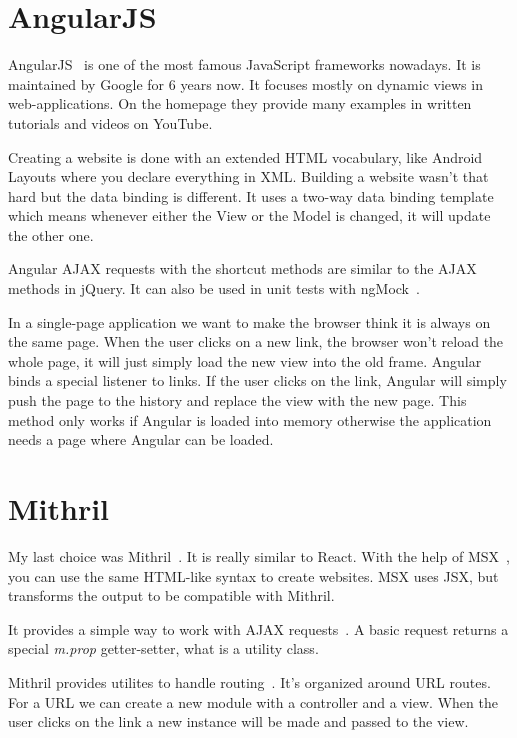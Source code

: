 \section{AngularJS}

AngularJS~\cite{Angular} is one of the most famous JavaScript frameworks nowadays.  It is maintained by Google for 6 years now. It focuses mostly on dynamic views in web-applications. On the homepage they provide many examples in written tutorials and videos on YouTube. 

Creating a website is done with an extended HTML vocabulary, like Android Layouts where you declare everything in XML. Building a website wasn't that hard but the data binding is different. It uses a two-way data binding template~\cite{Angular-Developer-DataBinding} which means whenever either the View or the Model is changed, it will update the other one.

Angular AJAX requests with the shortcut methods are similar to the AJAX methods in jQuery. It can also be used in unit tests with ngMock~\cite{Angular-AJAX}.

In a single-page application we want to make the browser think it is always on the same page. When the user clicks on a new link, the browser won't reload the whole page, it will just simply load the new view into the old frame. Angular binds a special listener to links. If the user clicks on the link, Angular will simply push the page to the history and replace the view with the new page. This method only works if Angular is loaded into memory otherwise the application needs a page where Angular can be loaded.


\section{Mithril}

My last choice was Mithril~\cite{Mithril}. It is really similar to React. With the help of MSX~\cite{MSX}, you can use the same HTML-like syntax to create websites. MSX uses JSX, but transforms the output to be compatible with Mithril. 

It provides a simple way to work with AJAX requests~\cite{Mithril-request}. A basic request returns a special \emph{m.prop} getter-setter, what is a utility class.

Mithril provides utilites to handle routing~\cite{Mithril-routing}. It's organized around URL routes. For a URL we can create a new module with a controller and a view. When the user clicks on the link a new instance will be made and passed to the view.

